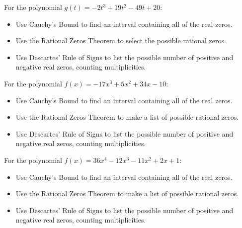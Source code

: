 \documentclass{ximera}
\begin{document}
\begin{problem}
For the polynomial $g(t) = -2t^{3} + 19t^{2} - 49t + 20$:

\begin{itemize}
\item  Use Cauchy's Bound to find an interval containing all of the real zeros.
\item  Use the Rational Zeros Theorem to select the possible rational zeros.
\begin{selectAll}
  \end{selectAll}
\item  Use Descartes' Rule of Signs to list the possible number of positive and negative real zeros, counting multiplicities.
\end{itemize}
\end{problem}

\begin{problem}
For the polynomial $f(x) = -17x^{3} + 5x^{2} + 34x - 10$:

\begin{itemize}
\item  Use Cauchy's Bound to find an interval containing all of the real zeros.
\item  Use the Rational Zeros Theorem to make a list of possible rational zeros.
\item  Use Descartes' Rule of Signs to list the possible number of positive and negative real zeros, counting multiplicities.
\end{itemize}
\end{problem}

\begin{problem}
For the polynomial $f(x) = 36x^{4} - 12x^{3} - 11x^{2} + 2x + 1$:

\begin{itemize}
\item  Use Cauchy's Bound to find an interval containing all of the real zeros.
\item  Use the Rational Zeros Theorem to make a list of possible rational zeros.
\item  Use Descartes' Rule of Signs to list the possible number of positive and negative real zeros, counting multiplicities.
\end{itemize}
\end{problem}
\end{document}
